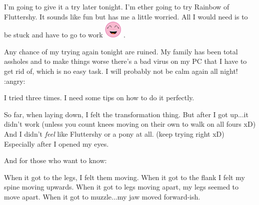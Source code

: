 \documentclass[ebook,12pt,oneside,openany]{memoir}
\begin{document}
\begin{tcolorbox}[title=Skycoaster]
\par{I'm going to give it a try later tonight. I'm ether going to try Rainbow of Fluttershy. It sounds like fun but has me a little worried. All I would need is to be stuck and have to go to work  \includegraphics{images/mlp_laugh.png} .}
\end{tcolorbox}
\begin{tcolorbox}[title=Shining Wing,colback=blue!5!white,colframe=blue!75!black,coltitle=white]
\par{Any chance of my trying again tonight are ruined. My family has been total assholes and to make things worse there's a bad virus on my PC that I have to get rid of, which is no easy task. I will probably not be calm again all night!  :angry:}
\end{tcolorbox}
\begin{tcolorbox}[title=Feather Gem]
\par{I tried three times.  I need some tips on how to do it perfectly.}
\par{So far, when laying down, I felt the transformation thing.  But after I got up...it didn't work (unless you count knees moving on their own to walk on all fours xD)  And I didn't \textit{feel }like Fluttershy or a pony at all.  (keep trying right xD)  Especially after I opened my eyes.}
\newline{}
\par{And for those who want to know:}
\par{When it got to the legs, I felt them moving.  When it got to the flank I felt my spine moving upwards.  When it got to legs moving apart, my legs seemed to move apart.  When it got to muzzle...my jaw moved forward-ish.}
\end{tcolorbox}
\end{document}
